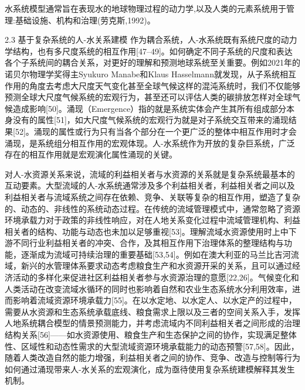 水系统模型通常旨在表现水的地球物理过程的动力学,以及人类的元素系统用于管理:基础设施、机构和治理(劳克斯,1992)。

2.3 基于复杂系统的人-水关系建模
作为耦合系统，人-水系统既有系统尺度的动力学结构，也有多尺度系统的相互作用[47–49]。如何确定不同子系统的尺度和表达各个子系统间的耦合关系，对更好的理解和预测地球系统至关重要。例如2021年的诺贝尔物理学奖得主Syukuro Manabe和Klaus Hasselmann就发现，从子系统相互作用的角度去考虑大尺度天气变化甚至全球气候这样的混沌系统时，我们不仅能够预测全球大尺度气候系统的宏观行为，甚至还可以评估人类的碳排放怎样对全球气候造成影响[50]。涌现（Emergence）指的就是系统实体会产生其所有组成部分本身没有的属性[51]，如大尺度气候系统的宏观行为就是对子系统交互带来的涌现结果[52]。涌现的属性或行为只有当各个部分在一个更广泛的整体中相互作用时才会涌现，是系统组分相互作用的宏观体现。人-水系统作为开放的复杂巨系统，广泛存在的相互作用就是宏观演化属性涌现的关键。

对人-水资源关系来说，流域的利益相关者与水资源的关系就是复杂系统最基本的互动要素。大型流域的人-水系统通常涉及多个利益相关者，利益相关者之间以及利益相关者与流域系统之间存在依赖、竞争、关联等复杂的相互作用，塑造了复杂的、动态的、非线性的系统动态过程。在传统的流域管理模式中，通常忽略了资源环境承载力对于政策的非线性响应，对在人地关系变化过程中流域管理机构、利益相关者的结构、功能与动态也未加以足够重视[53]。理解流域水资源使用时上中下游不同行业利益相关者的冲突、合作，及其相互作用下治理体系的整理结构与功能，逐渐成为流域可持续治理的重要基础[53,54]。例如在澳大利亚的马兰比吉河流域，新兴的水管理体系要求动态考虑粮食生产和水资源开采的关系，且可以通过经济活动的多样化来促进社区利益相关者参与水资源治理的意愿[22,26]。气候变化和人类活动在改变流域水循环的同时也影响着自然和农业生态系统水分利用效率，进而影响着流域资源环境承载力[55]。在以水定地、以水定人、以水定产的过程中，需要从水资源和生态系统承载底线、粮食需求上限以及三者的空间关系入手，发挥人地系统耦合模型的情景预测能力，并考虑流域内不同利益相关者之间形成的治理结构关系[56]——如水资源使用、粮食生产和生态保护之间的协作，实现满足整体性、区域性和动态性需求的大型流域资源环境承载能力的动态预警[57,58]。因此，随着人类改造自然的能力增强，利益相关者之间的协作、竞争、改造与控制等行为如何通过涌现带来人-水关系的宏观演化，成为亟待使用复杂系统建模解释其发生机制。

